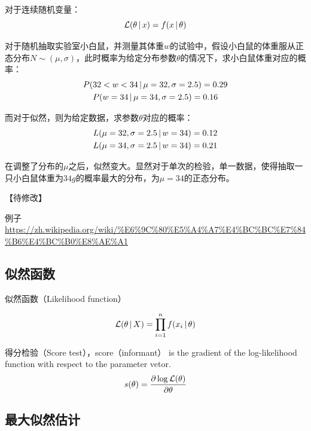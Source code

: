 \documentclass[11pt]{article}
\begin{document}
对于连续随机变量：
\begin{equation*}
    \mathcal{L}(\theta\,\vert\, x) = f(x\,\vert\, \theta)
\end{equation*}

\begin{example}
    对于随机抽取实验室小白鼠，并测量其体重$w$的试验中，假设小白鼠的体重服从正态分布$N\sim(\mu,\sigma)$，此时概率为给定分布参数$\theta$的情况下，求小白鼠体重对应的概率：
    \begin{gather*}
        P( 32<w<34 \,\vert\, \mu= 32,\sigma=2.5) = 0.29 \\
        P( w=34 \,\vert\, \mu=34,\sigma=2.5) = 0.16
    \end{gather*}

    而对于似然，则为给定数据，求参数$\theta$对应的概率：
    \begin{gather*}
        L( \mu=32,\sigma=2.5 \,\vert\, w=34) = 0.12 \\
        L( \mu=34,\sigma=2.5 \,\vert\, w=34) = 0.21
    \end{gather*}

    在调整了分布的$\mu$之后，似然变大。显然对于单次的检验，单一数据，使得抽取一只小白鼠体重为$34g$的概率最大的分布，为$\mu=34$的正态分布。
\end{example}

【待修改】

例子
\url{https://zh.wikipedia.org/wiki/%E6%9C%80%E5%A4%A7%E4%BC%BC%E7%84%B6%E4%BC%B0%E8%AE%A1}

\subsection{似然函数}

似然函数（Likelihood function）

\begin{equation*}
    \mathcal{L}(\theta \,\vert\, X) = \prod_{i=1}^{n} f(x_i \,\vert\, \theta)
\end{equation*}

得分检验（Score test），score（informant） is the gradient of the log-likelihood function with respect to the parameter vetor.
\begin{equation*}
    s(\theta) = \frac{\partial \log \mathcal{L}(\theta)}{\partial \theta}
\end{equation*}

\subsection{最大似然估计}
\end{document}
